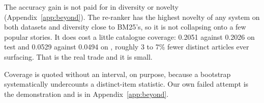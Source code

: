 The accuracy gain is not paid for in diversity or novelty (Appendix~\ref{app:beyond}).
The re-ranker has the highest novelty of any system on both datasets and diversity close to
BM25's, so it is not collapsing onto a few popular stories. It does cost a little catalogue
coverage: 0.2051 against 0.2026 on \eb{} test and 0.0529 against 0.0494 on \mind{}, roughly 3 to
7\% fewer distinct articles ever surfacing. That is the real trade and it is small.

Coverage is quoted without an interval, on purpose, because a bootstrap systematically
undercounts a distinct-item statistic. Our own failed attempt is the demonstration and is in
Appendix~\ref{app:beyond}.

